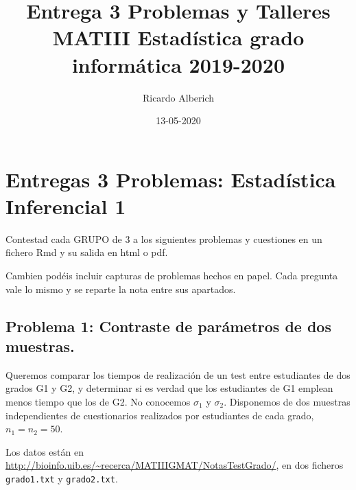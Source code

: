 \documentclass[
]{article}
\title{Entrega 3 Problemas y Talleres MATIII Estadística grado informática
2019-2020}
\author{Ricardo Alberich}
\date{13-05-2020}
\newenvironment{Shaded}{\begin{snugshade}}{\end{snugshade}}
\newcommand{\DataTypeTok}[1]{\textcolor[rgb]{0.13,0.29,0.53}{#1}}
\newcommand{\KeywordTok}[1]{\textcolor[rgb]{0.13,0.29,0.53}{\textbf{#1}}}
\newcommand{\NormalTok}[1]{#1}
\newcommand{\OperatorTok}[1]{\textcolor[rgb]{0.81,0.36,0.00}{\textbf{#1}}}
\newcommand{\OtherTok}[1]{\textcolor[rgb]{0.56,0.35,0.01}{#1}}
\newcommand{\StringTok}[1]{\textcolor[rgb]{0.31,0.60,0.02}{#1}}
\begin{document}
\maketitle

{
\hypersetup{linkcolor=blue}
\setcounter{tocdepth}{2}
\tableofcontents
}
\hypertarget{entregas-3-problemas-estaduxedstica-inferencial-1}{%
\section{Entregas 3 Problemas: Estadística Inferencial
1}\label{entregas-3-problemas-estaduxedstica-inferencial-1}}

Contestad cada GRUPO de 3 a los siguientes problemas y cuestiones en un
fichero Rmd y su salida en html o pdf.

Cambien podéis incluir capturas de problemas hechos en papel. Cada
pregunta vale lo mismo y se reparte la nota entre sus apartados.

\hypertarget{problema-1-contraste-de-paruxe1metros-de-dos-muestras.}{%
\subsection{Problema 1: Contraste de parámetros de dos
muestras.}\label{problema-1-contraste-de-paruxe1metros-de-dos-muestras.}}

Queremos comparar los tiempos de realización de un test entre
estudiantes de dos grados G1 y G2, y determinar si es verdad que los
estudiantes de G1 emplean menos tiempo que los de G2. No conocemos
\(\sigma_1\) y \(\sigma_2\). Disponemos de dos muestras independientes
de cuestionarios realizados por estudiantes de cada grado,
\(n_1=n_2=50\).

Los datos están en
\url{http://bioinfo.uib.es/~recerca/MATIIIGMAT/NotasTestGrado/}, en dos
ficheros \texttt{grado1.txt} y \texttt{grado2.txt}.

\begin{Shaded}
\end{Shaded}
\end{document}
